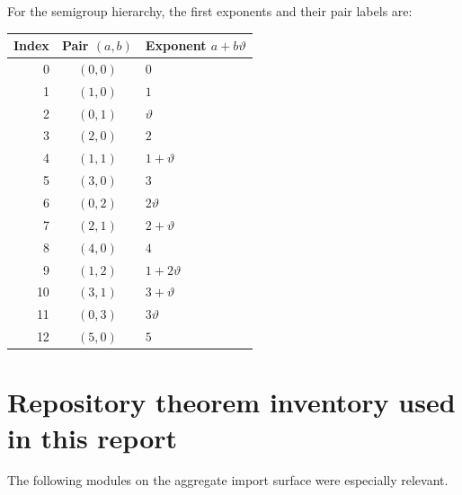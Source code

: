 \documentclass[11pt,oneside]{article}
\theoremstyle{definition}
\theoremstyle{remark}
\newcommand{\thetaq}{\vartheta}
\begin{document}
For the semigroup hierarchy, the first exponents and their pair labels are:
\begin{center}
\small
\begin{tabular}{rcl}
\toprule
Index & Pair $(a,b)$ & Exponent $a+b\thetaq$ \\
\midrule
0 & $(0,0)$ & $0$ \\
1 & $(1,0)$ & $1$ \\
2 & $(0,1)$ & $\thetaq$ \\
3 & $(2,0)$ & $2$ \\
4 & $(1,1)$ & $1+\thetaq$ \\
5 & $(3,0)$ & $3$ \\
6 & $(0,2)$ & $2\thetaq$ \\
7 & $(2,1)$ & $2+\thetaq$ \\
8 & $(4,0)$ & $4$ \\
9 & $(1,2)$ & $1+2\thetaq$ \\
10 & $(3,1)$ & $3+\thetaq$ \\
11 & $(0,3)$ & $3\thetaq$ \\
12 & $(5,0)$ & $5$ \\
\bottomrule
\end{tabular}
\end{center}

\section{Repository theorem inventory used in this report}
\label{app:inventory}

The following modules on the aggregate import surface were especially relevant.
\end{document}

